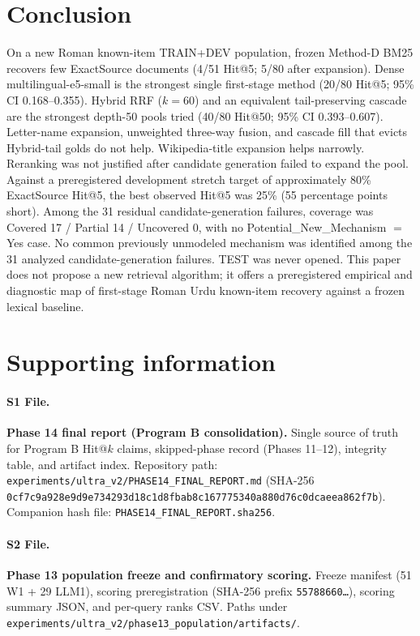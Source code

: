 \documentclass[10pt,letterpaper]{article}
\begin{document}
\section*{Conclusion}
On a new Roman known-item TRAIN+DEV population, frozen Method-D BM25 recovers few ExactSource documents (4/51 Hit@5; 5/80 after expansion). Dense multilingual-e5-small is the strongest single first-stage method (20/80 Hit@5; 95\% CI 0.168--0.355). Hybrid RRF ($k = 60$) and an equivalent tail-preserving cascade are the strongest depth-50 pools tried (40/80 Hit@50; 95\% CI 0.393--0.607). Letter-name expansion, unweighted three-way fusion, and cascade fill that evicts Hybrid-tail golds do not help. Wikipedia-title expansion helps narrowly. Reranking was not justified after candidate generation failed to expand the pool. Against a preregistered development stretch target of approximately 80\% ExactSource Hit@5, the best observed Hit@5 was 25\% (55 percentage points short). Among the 31 residual candidate-generation failures, coverage was Covered 17 / Partial 14 / Uncovered 0, with no Potential\_New\_Mechanism $=$ Yes case. No common previously unmodeled mechanism was identified among the 31 analyzed candidate-generation failures. TEST was never opened. This paper does not propose a new retrieval algorithm; it offers a preregistered empirical and diagnostic map of first-stage Roman Urdu known-item recovery against a frozen lexical baseline.

\section*{Supporting information}

\paragraph*{S1 File.}
\label{S1_File}
\textbf{Phase 14 final report (Program B consolidation).} Single source of truth for Program B Hit@$k$ claims, skipped-phase record (Phases 11--12), integrity table, and artifact index. Repository path: \texttt{experiments/ultra\_v2/PHASE14\_FINAL\_REPORT.md} (SHA-256 \texttt{0cf7c9a928e9d9e734293d18c1d8fbab8c167775340a880d76c0dcaeea862f7b}). Companion hash file: \texttt{PHASE14\_FINAL\_REPORT.sha256}.

\paragraph*{S2 File.}
\label{S2_File}
\textbf{Phase 13 population freeze and confirmatory scoring.} Freeze manifest (51 W1 + 29 LLM1), scoring preregistration (SHA-256 prefix \texttt{55788660\ldots}), scoring summary JSON, and per-query ranks CSV. Paths under \texttt{experiments/ultra\_v2/phase13\_population/artifacts/}.
\end{document}
